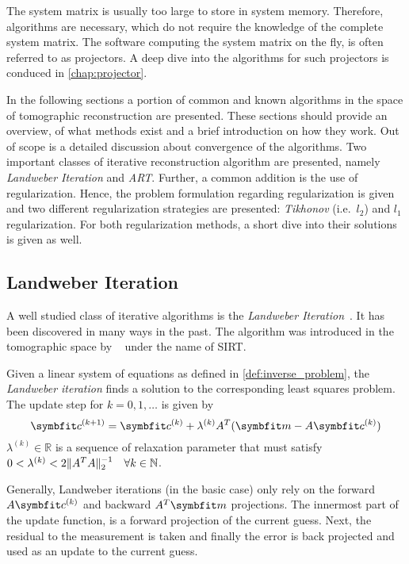 The system matrix is usually too large to store in system memory. Therefore, algorithms are
necessary, which do not require the knowledge of the complete system matrix. The software computing
the system matrix on the fly, is often referred to as projectors. A deep dive into the algorithms
for such projectors is conduced in \autoref{chap:projector}.

In the following sections a portion of common and known algorithms in the space of tomographic
reconstruction are presented. These sections should provide an overview, of what methods exist and
a brief introduction on how they work. Out of scope is a detailed discussion about convergence of
the algorithms. Two important classes of iterative reconstruction algorithm are presented, namely
\textit{Landweber Iteration} and \textit{\gls{ART}}. Further, a common addition is the use of
regularization. Hence, the problem formulation regarding regularization is given and two different
regularization strategies are presented: \textit{Tikhonov} (i.e.\ \(l_2\)) and \(l_1\)
regularization. For both regularization methods, a short dive into their solutions is given as well.

\subsection{Landweber Iteration}\label{subsec:landweber_iteration}

A well studied class of iterative algorithms is the \textit{Landweber
	Iteration}~\cite{landweber_iteration_1951}. It has been discovered in many ways in the past.
The algorithm was introduced in the tomographic space by
\citeauthor{gilbert_iterative_1972}~\cite{gilbert_iterative_1972} under the name of
\gls{SIRT}.

\begin{definition}\label{def:landweber_iteration}
	Given a linear system of equations as defined in \autoref{def:inverse_problem}, the
	\textit{Landweber iteration} finds a solution to the corresponding least squares problem. The update
	step for \(k = 0, 1, \dots\) is given by
	\[
		\mvec{c}^{(k+1)} = \mvec{c}^{(k)} + \lambda^{(k)} A^T(\mvec{m} - A\mvec{c}^{(k)})
	\]
	\(\lambda^{(k)} \in \mathbb{R}\) is a sequence of relaxation parameter that must satisfy
	\(0 < \lambda^{(k)} < 2 \norm{A^T A}_2^{-1}\quad \forall k \in \mathbb{N}\).
\end{definition}

Generally, Landweber iterations (in the basic case) only rely on the forward \(A\mvec{c}^{(k)}\) and backward
\(A^T \mvec{m}\) projections. The innermost part of the update function, is a forward projection of the
current guess. Next, the residual to the measurement is taken and finally the error is back
projected and used as an update to the current guess.

